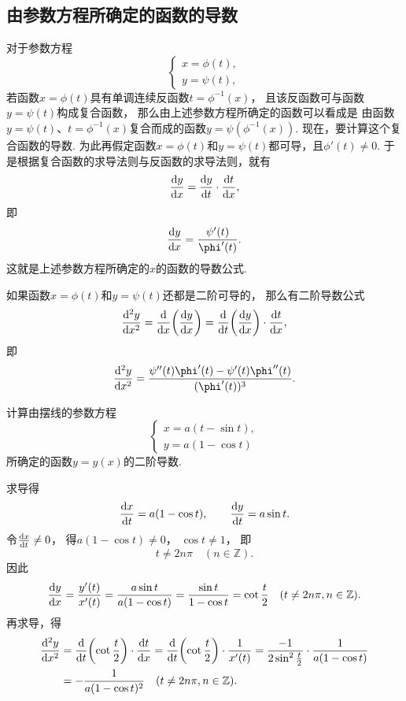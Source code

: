 \subsection{由参数方程所确定的函数的导数}
对于参数方程\[
	\left\{ \begin{array}{l}
		x = \phi(t), \\
		y = \psi(t),
	\end{array} \right.
\]
若函数\(x = \phi(t)\)具有单调连续反函数\(t=\phi^{-1}(x)\)，
且该反函数可与函数\(y = \psi(t)\)构成复合函数，
那么由上述参数方程所确定的函数可以看成是
由函数\(y=\psi(t)\)、\(t=\phi^{-1}(x)\)复合而成的函数\(y=\psi(\phi^{-1}(x))\).
现在，要计算这个复合函数的导数.
为此再假定函数\(x = \phi(t)\)和\(y = \psi(t)\)都可导，且\(\phi'(t) \neq 0\).
于是根据复合函数的求导法则与反函数的求导法则，就有\[
	\dv{y}{x}
	= \dv{y}{t} \cdot \dv{t}{x},
\]
即\begin{equation}\label{equation:导数.参数方程确定的函数的一阶导数}
	\dv{y}{x}
	= \frac{\psi'(t)}{\phi'(t)}.
\end{equation}
这就是上述参数方程所确定的\(x\)的函数的导数公式.

如果函数\(x = \phi(t)\)和\(y = \psi(t)\)还都是二阶可导的，
那么有二阶导数公式\[
	\dv[2]{y}{x}
	= \dv{x}(\dv{y}{x})
	= \dv{t}(\dv{y}{x}) \cdot \dv{t}{x},
\]
即\begin{equation}\label{equation:导数.参数方程确定的函数的二阶导数}
	\dv[2]{y}{x}
	= \frac{\psi''(t) \phi'(t) - \psi'(t) \phi''(t)}{(\phi'(t))^3}.
\end{equation}

\begin{example}
计算由摆线的参数方程\[
	\left\{ \begin{array}{l}
		x=a(t-\sin t), \\
		y=a(1-\cos t)
	\end{array} \right.
\]所确定的函数\(y=y(x)\)的二阶导数.
\begin{solution}
求导得\[
	\dv{x}{t}=a(1-\cos t), \qquad
	\dv{y}{t}=a\sin t.
\]
令\(\dv{x}{t}\neq0\)，
得\(a(1-\cos t)\neq0\)，
\(\cos t\neq1\)，
即\[
	t\neq 2n\pi
	\quad(n\in\mathbb{Z}).
\]
因此\[
	\dv{y}{x}
	=\frac{y'(t)}{x'(t)}
	=\frac{a\sin t}{a(1-\cos t)}
	=\frac{\sin t}{1-\cos t}
	=\cot\frac{t}{2}
	\quad(t\neq 2n\pi,n\in\mathbb{Z}).
\]
再求导，得\begin{align*}
	\dv[2]{y}{x}
	&=\dv{t}(\cot\frac{t}{2}) \cdot \dv{t}{x}
	=\dv{t}(\cot\frac{t}{2}) \cdot \frac{1}{x'(t)}
	=\frac{-1}{2\sin^2\frac{t}{2}}
	\cdot\frac{1}{a(1-\cos t)} \\
	&=-\frac{1}{a(1-\cos t)^2}
	\quad(t\neq 2n\pi,n\in\mathbb{Z}).
\end{align*}
\end{solution}
\end{example}

